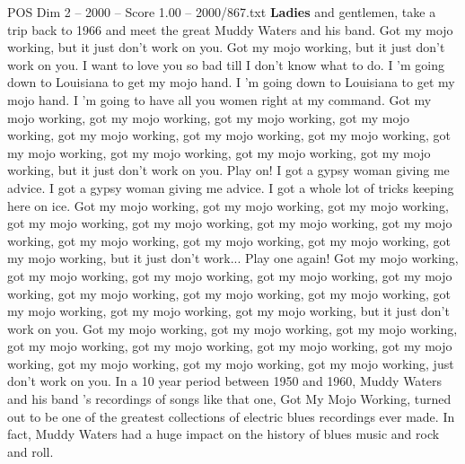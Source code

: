 \begin{textsample}{POS Dim 2 – 2000 – Score 1.00 – 2000/867.txt}  \label{ex:f2_pos_014}
\textbf{Ladies} and gentlemen, take a trip back to 1966 and meet the great Muddy Waters and his band.
Got my mojo working, but it just don't work on you.
Got my mojo working, but it just don't work on you.
I want to love you so bad till I don't know what to do.
I 'm going down to Louisiana to get my mojo hand.
I 'm going down to Louisiana to get my mojo hand.
I 'm going to have all you women right at my command.
Got my mojo working, got my mojo working, got my mojo working, got my mojo working, got my mojo working, got my mojo working, got my mojo working, got my mojo working, got my mojo working, got my mojo working, got my mojo working, but it just don't work on you.
Play on!
I got a gypsy woman giving me advice.
I got a gypsy woman giving me advice.
I got a whole lot of tricks keeping here on ice.
Got my mojo working, got my mojo working, got my mojo working, got my mojo working, got my mojo working, got my mojo working, got my mojo working, got my mojo working, got my mojo working, got my mojo working, got my mojo working, but it just don't work...
Play one again!
Got my mojo working, got my mojo working, got my mojo working, got my mojo working, got my mojo working, got my mojo working, got my mojo working, got my mojo working, got my mojo working, got my mojo working, got my mojo working, but it just don't work on you.
Got my mojo working, got my mojo working, got my mojo working, got my mojo working, got my mojo working, got my mojo working, got my mojo working, got my mojo working, got my mojo working, got my mojo working, just don't work on you.
In a 10 year period between 1950 and 1960, Muddy Waters and his band 's recordings of songs like that one, Got My Mojo Working, turned out to be one of the greatest collections of electric blues recordings ever made.
In fact, Muddy Waters had a huge impact on the history of blues music and rock and roll.

\end{textsample}
